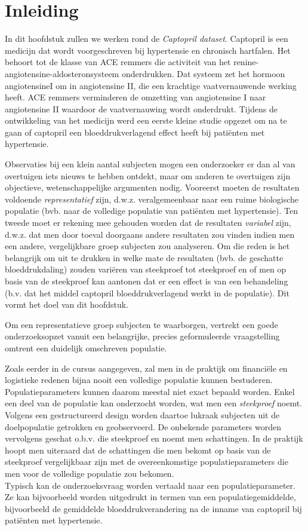\documentclass[
  dutch,
  letterpaper,
  12pt]{book}
\theoremstyle{definition}
\theoremstyle{definition}
\theoremstyle{definition}
\theoremstyle{remark}
\begin{document}
\section{Inleiding}\label{inleiding-4}

In dit hoofdstuk zullen we werken rond de \emph{Captopril dataset}.
Captopril is een medicijn dat wordt voorgeschreven bij hypertensie en
chronisch hartfalen. Het behoort tot de klasse van ACE remmers die
activiteit van het renine-angiotensine-aldosteronsysteem onderdrukken.
Dat systeem zet het hormoon angiotensineI om in angiotensine II, die een
krachtige vaatvernauwende werking heeft. ACE remmers verminderen de
omzetting van angiotensine I naar angiotensine II waardoor de
vaatvernauwing wordt onderdrukt. Tijdens de ontwikkeling van het
medicijn werd een eerste kleine studie opgezet om na te gaan of
captopril een bloeddrukverlagend effect heeft bij patiënten met
hypertensie.

Observaties bij een klein aantal subjecten mogen een onderzoeker er dan
al van overtuigen iets nieuws te hebben ontdekt, maar om anderen te
overtuigen zijn objectieve, wetenschappelijke argumenten nodig.
Vooreerst moeten de resultaten voldoende \emph{representatief} zijn,
d.w.z. veralgemeenbaar naar een ruime biologische populatie (bvb. naar
de volledige populatie van patiënten met hypertensie). Ten tweede moet
er rekening mee gehouden worden dat de resultaten \emph{variabel} zijn,
d.w.z. dat men door toeval doorgaans andere resultaten zou vinden indien
men een andere, vergelijkbare groep subjecten zou analyseren. Om die
reden is het belangrijk om uit te drukken in welke mate de resultaten
(bvb. de geschatte bloeddrukdaling) zouden variëren van steekproef tot
steekproef en of men op basis van de steekproef kan aantonen dat er een
effect is van een behandeling (b.v. dat het middel captopril
bloeddrukverlagend werkt in de populatie). Dit vormt het doel van dit
hoofdstuk.

Om een representatieve groep subjecten te waarborgen, vertrekt een goede
onderzoeksopzet vanuit een belangrijke, precies geformuleerde
vraagstelling omtrent een duidelijk omschreven populatie.

Zoals eerder in de cursus aangegeven, zal men in de praktijk om
financiële en logistieke redenen bijna nooit een volledige populatie
kunnen bestuderen. Populatieparameters kunnen daarom meestal niet exact
bepaald worden. Enkel een deel van de populatie kan onderzocht worden,
wat men een \emph{steekproef} noemt. Volgens een gestructureerd design
worden daartoe lukraak subjecten uit de doelpopulatie getrokken en
geobserveerd. De onbekende parameters worden vervolgens geschat o.b.v.
die steekproef en noemt men schattingen. In de praktijk hoopt men
uiteraard dat de schattingen die men bekomt op basis van de steekproef
vergelijkbaar zijn met de overeenkomstige populatieparameters die men
voor de volledige populatie zou bekomen.\\
Typisch kan de onderzoeksvraag worden vertaald naar een
populatieparameter. Ze kan bijvoorbeeld worden uitgedrukt in termen van
een populatiegemiddelde, bijvoorbeeld de gemiddelde bloeddrukverandering
na de inname van captopril bij patiënten met hypertensie.
\end{document}
